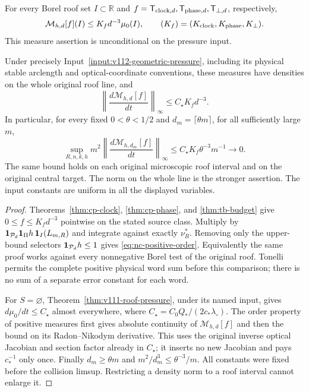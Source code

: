\begin{theorem}
\label{thm:nc-normalized}
For every Borel roof set $I\subset\mathbb R$ and
$f=\mathsf T_{{\rm clock},d},\mathsf T_{{\rm phase},d},
\mathsf T_{\perp,d}$, respectively,
\begin{equation}\label{eq:nc-positive-order}
 \mathcal M_{h,d}[f](I)\le K_f d^{-3}\mu_0(I),
 \qquad
 (K_f)=(K_{\rm clock},K_{\rm phase},K_\perp).
\end{equation}
This measure assertion is unconditional on the pressure input.

Under precisely Input~\ref{input:v112-geometric-pressure}, including
its physical stable arclength and optical-coordinate conventions,
these measures have densities on the whole original roof line, and
\begin{equation}\label{eq:nc-roof-cost}
 \left\|\frac{d\mathcal M_{h,d}[f]}{dt}\right\|_\infty
                                      \le C_\star K_f d^{-3}.
\end{equation}
In particular, for every fixed $0<\theta<1/2$ and
$d_m=\lceil\theta m\rceil$, for all sufficiently large $m$,
\begin{equation}\label{eq:nc-normalization}
 \sup_{R,n,k,h}
 m^2\left\|\frac{d\mathcal M_{h,d_m}[f]}{dt}\right\|_\infty
 \le C_\star K_f\theta^{-3}m^{-1}\longrightarrow0.
\end{equation}
The same bound holds on each original microscopic roof interval and
on the original central target.  The norm on the whole line is the
stronger assertion.  The input constants are uniform in all the
displayed variables.
\end{theorem}
\begin{proof}
Theorems~\ref{thm:cp-clock}, \ref{thm:cp-phase}, and
\ref{thm:tb-budget} give $0\le f\le K_fd^{-3}$ pointwise on the
stated source class.  Multiply by
$\mathbf1_{\mathcal P_d}\mathbf1_\Pi h\,\mathbf1_I(L_{m,R})$ and integrate
against exactly $\nu_R^*$.  Removing only the upper-bound selectors
$\mathbf1_{\mathcal P_d}h\le1$ gives \eqref{eq:nc-positive-order}.
Equivalently the same proof works against every nonnegative Borel
test of the original roof.  Tonelli permits the complete positive
physical word sum before this comparison; there is no sum of a
separate error constant for each word.

For $S=\varnothing$, Theorem~\ref{thm:v111-roof-pressure}, under its
named input, gives $d\mu_0/dt\le C_\star$ almost everywhere, where
$C_\star=C_0Q_*/(2c_*\lambda_\circ)$.
The order property of positive measures first gives absolute
continuity of $\mathcal M_{h,d}[f]$ and then the bound on its
Radon--Nikodym derivative.  This uses the original inverse optical
Jacobian and section factor already in $C_\star$; it inserts no new
Jacobian and pays $c_*^{-1}$ only once.  Finally
$d_m\ge\theta m$ and $m^2/d_m^3\le\theta^{-3}/m$.
All constants were fixed before the collision limsup.  Restricting
a density norm to a roof interval cannot enlarge it.
\end{proof}

